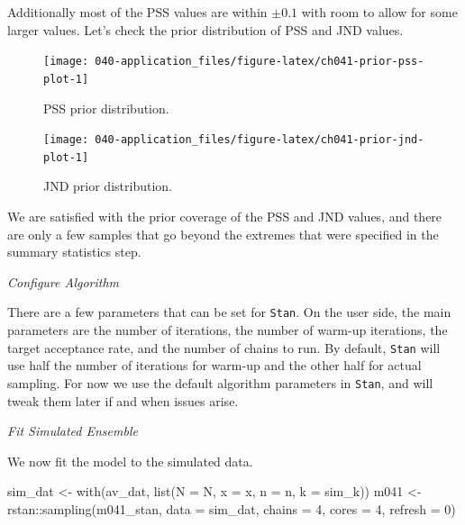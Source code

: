\documentclass[11pt, oneside, openany]{scrbook}
\newenvironment{Shaded}{\begin{snugshade}}{\end{snugshade}}
\newcommand{\AttributeTok}[1]{\textcolor[rgb]{0.77,0.63,0.00}{#1}}
\newcommand{\DecValTok}[1]{\textcolor[rgb]{0.00,0.00,0.81}{#1}}
\newcommand{\FunctionTok}[1]{\textcolor[rgb]{0.00,0.00,0.00}{#1}}
\newcommand{\NormalTok}[1]{#1}
\newcommand{\OtherTok}[1]{\textcolor[rgb]{0.56,0.35,0.01}{#1}}
\newcommand{\SpecialCharTok}[1]{\textcolor[rgb]{0.00,0.00,0.00}{#1}}
\begin{document}
Additionally most of the PSS values are within \(\pm 0.1\) with room to allow for some larger values. Let's check the prior distribution of PSS and JND values.

\begin{figure}

{\centering \texttt{[image: 040-application\_files/figure-latex/ch041-prior-pss-plot-1]} 

}

\caption{PSS prior distribution.}\label{fig:ch041-prior-pss-plot}
\end{figure}

\begin{figure}

{\centering \texttt{[image: 040-application\_files/figure-latex/ch041-prior-jnd-plot-1]} 

}

\caption{JND prior distribution.}\label{fig:ch041-prior-jnd-plot}
\end{figure}

We are satisfied with the prior coverage of the PSS and JND values, and there are only a few samples that go beyond the extremes that were specified in the summary statistics step.

\emph{Configure Algorithm}

There are a few parameters that can be set for \texttt{Stan}. On the user side, the main parameters are the number of iterations, the number of warm-up iterations, the target acceptance rate, and the number of chains to run. By default, \texttt{Stan} will use half the number of iterations for warm-up and the other half for actual sampling. For now we use the default algorithm parameters in \texttt{Stan}, and will tweak them later if and when issues arise.

\emph{Fit Simulated Ensemble}

We now fit the model to the simulated data.


\begin{Shaded}
\begin{Highlighting}[]
\NormalTok{sim\_dat }\OtherTok{\textless{}{-}} \FunctionTok{with}\NormalTok{(av\_dat, }\FunctionTok{list}\NormalTok{(}\AttributeTok{N =}\NormalTok{ N, }\AttributeTok{x =}\NormalTok{ x, }\AttributeTok{n =}\NormalTok{ n, }\AttributeTok{k =}\NormalTok{ sim\_k)) }
\NormalTok{m041 }\OtherTok{\textless{}{-}}\NormalTok{ rstan}\SpecialCharTok{::}\FunctionTok{sampling}\NormalTok{(m041\_stan, }\AttributeTok{data =}\NormalTok{ sim\_dat, }
                        \AttributeTok{chains =} \DecValTok{4}\NormalTok{, }\AttributeTok{cores =} \DecValTok{4}\NormalTok{, }\AttributeTok{refresh =} \DecValTok{0}\NormalTok{)}
\end{Highlighting}
\end{Shaded}
\end{document}
